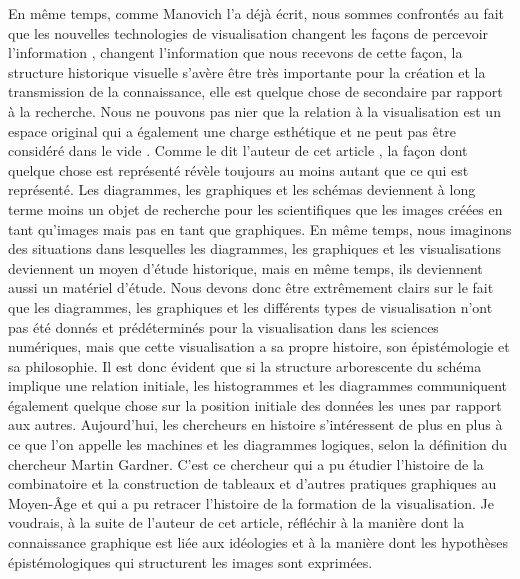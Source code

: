 \documentclass[a4paper, twoside, 12pt]{book}
\begin{document}
En même temps, comme Manovich l'a déjà écrit, nous sommes confrontés au fait que les nouvelles technologies de visualisation changent les façons de percevoir l'information , changent l'information que nous recevons de cette façon, la structure historique visuelle s'avère être très importante pour la création et la transmission de la connaissance, elle est quelque chose de secondaire par rapport à la recherche. Nous ne pouvons pas nier que la relation à la visualisation est un espace original qui a également une charge esthétique et ne peut pas être considéré dans le vide . Comme le dit l'auteur de cet article , la façon dont quelque chose est représenté révèle toujours au moins autant que ce qui est représenté.  Les diagrammes, les graphiques et les schémas deviennent à long terme moins un objet de recherche pour les scientifiques que les images créées en tant qu'images mais pas en tant que graphiques. En même temps, nous imaginons des situations dans lesquelles les diagrammes, les graphiques et les visualisations deviennent un moyen d'étude historique, mais en même temps, ils deviennent aussi un matériel d'étude. Nous devons donc être extrêmement clairs sur le fait que les diagrammes, les graphiques et les différents types de visualisation n'ont pas été donnés et prédéterminés pour la visualisation dans les sciences numériques, mais que cette visualisation a sa propre histoire, son épistémologie et sa philosophie. Il est donc évident que si la structure arborescente du schéma implique une relation initiale, les histogrammes et les diagrammes communiquent également quelque chose sur la position initiale des données les unes par rapport aux autres. Aujourd'hui, les chercheurs en histoire s'intéressent de plus en plus à ce que l'on appelle les machines et les diagrammes logiques, selon la définition du chercheur Martin Gardner. C'est ce chercheur qui a pu étudier l'histoire de la combinatoire et la construction de tableaux et d'autres pratiques graphiques au Moyen-Âge et qui a pu retracer l'histoire de la formation de la visualisation. Je voudrais, à la suite de l'auteur de cet article, réfléchir à la manière dont la connaissance graphique est liée aux idéologies et à la manière dont les hypothèses épistémologiques qui structurent les images sont exprimées.
\end{document}
